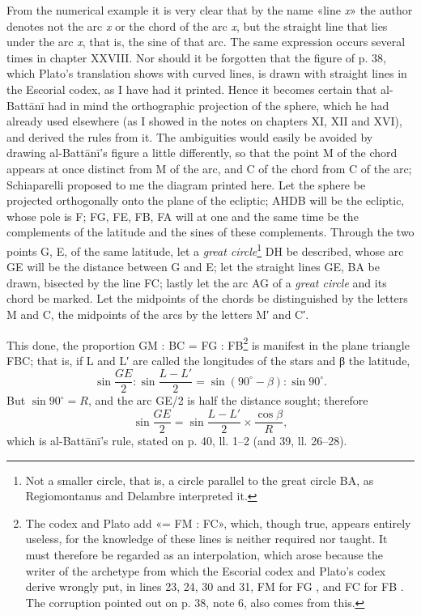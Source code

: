 \documentclass[11pt]{article}
\newcommand{\Pg}[1]{\marginpar{\footnotesize\color{gray}#1}}
\begin{document}
\par \Pg{I 201}From the numerical example it is very clear that by the name «line \emph{x}» the author denotes not the arc \emph{x} or the chord of the arc \emph{x}, but the straight line that lies under the arc \emph{x}, that is, the sine of that arc. The same expression occurs several times in chapter XXVIII. Nor should it be forgotten that the figure of p. 38, which Plato's translation shows with curved lines, is drawn with straight lines in the Escorial codex, as I have had it printed. Hence it becomes certain that al-Battānī had in mind the orthographic projection of the sphere, which he had already used elsewhere (as I showed in the notes on chapters XI, XII and XVI), and derived the rules from it. The ambiguities would easily be avoided by drawing al-Battānī's figure a little differently, so that the point M of the chord appears at once distinct from M of the arc, and C of the chord from C of the arc; Schiaparelli proposed to me the diagram printed here. Let the sphere be projected orthogonally onto the plane of the ecliptic; AHDB will be the ecliptic, whose pole is F; FG, FE, FB, FA will at one and the same time be the complements of the latitude and the sines of these complements. Through the two points G, E, of the same latitude, let a \emph{great circle}\footnote{Not a smaller circle, that is, a circle parallel to the great circle BA, as Regiomontanus and Delambre interpreted it.} DH be described, whose arc GE will be the distance between G and E; let the straight lines GE, BA be drawn, bisected by the line FC; lastly let the arc AG of a \emph{great circle} and its chord be marked. Let the midpoints of the chords be distinguished by the letters M and C, the midpoints of the arcs by the letters M′ and C′.\par
\begin{center}\end{center}
\par This done, the proportion GM : BC = FG : FB\footnote{The codex and Plato add «= FM : FC», which, though true, appears entirely useless, for the knowledge of these lines is neither required nor taught. It must therefore be regarded as an interpolation, which arose because the writer of the archetype from which the Escorial codex and Plato's codex derive wrongly put, in lines 23, 24, 30 and 31, FM  for FG , and FC  for FB . The corruption pointed out on p. 38, note 6, also comes from this.} is manifest in the plane triangle FBC; that is, if L and L′ are called the longitudes of the stars and {\greekfont β} the latitude, \[ \sin\frac{GE}{2} : \sin\frac{L - L'}{2} = \sin(90^\circ - \beta) : \sin 90^\circ. \] But $\sin 90^\circ = R$, and the arc GE/2 is half the distance sought; therefore \[ \sin\frac{GE}{2} = \sin\frac{L - L'}{2} \times \frac{\cos\beta}{R}, \] which is al-Battānī's rule, stated on p. 40, ll. 1–2 (and 39, ll. 26–28).\par
\end{document}
